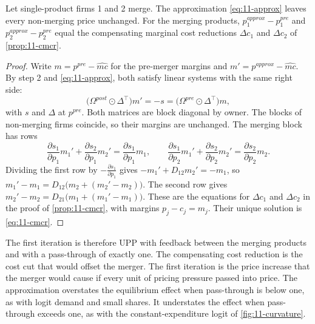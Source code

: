 \begin{proposition}\label{prop:11-approx}
Let single-product firms 1 and 2 merge. The approximation \eqref{eq:11-approx} leaves every non-merging price unchanged.
For the merging products, $p_1^{approx} - p_1^{pre}$ and $p_2^{approx} - p_2^{pre}$ equal the compensating marginal
cost reductions $\Delta c_1$ and $\Delta c_2$ of \cref{prop:11-cmcr}.
\end{proposition}

\begin{proof}
Write $m = p^{pre} - \widehat{mc}$ for the pre-merger margins and $m' = p^{approx} - \widehat{mc}$. By step 2 and
\eqref{eq:11-approx}, both satisfy linear systems with the same right side:
\begin{equation*}
  \big(\Omega^{post} \odot \Delta^\top\big) m' = -s = \big(\Omega^{pre} \odot \Delta^\top\big) m ,
\end{equation*}
with $s$ and $\Delta$ at $p^{pre}$. Both matrices are block diagonal by owner. The blocks of non-merging firms coincide,
so their margins are unchanged. The merging block has rows
\begin{equation*}
  \frac{\partial s_1}{\partial p_1} m_1' + \frac{\partial s_2}{\partial p_1} m_2' = \frac{\partial s_1}{\partial p_1} m_1 , \qquad
  \frac{\partial s_1}{\partial p_2} m_1' + \frac{\partial s_2}{\partial p_2} m_2' = \frac{\partial s_2}{\partial p_2} m_2 .
\end{equation*}
Dividing the first row by $-\frac{\partial s_1}{\partial p_1}$ gives $-m_1' + D_{12} m_2' = -m_1$, so
$m_1' - m_1 = D_{12}\big(m_2 + (m_2' - m_2)\big)$. The second row gives $m_2' - m_2 = D_{21}\big(m_1 + (m_1' - m_1)\big)$.
These are the equations for $\Delta c_1$ and $\Delta c_2$ in the proof of \cref{prop:11-cmcr}, with margins
$p_j - c_j = m_j$. Their unique solution is \eqref{eq:11-cmcr}.
\end{proof}

The first iteration is therefore UPP with feedback between the merging products and with a pass-through of exactly
one. The compensating cost reduction is the cost cut that would offset the merger. The first iteration is the price
increase that the merger would cause if every unit of pricing pressure passed into price. The approximation overstates
the equilibrium effect when pass-through is below one, as with logit demand and small shares. It understates the effect
when pass-through exceeds one, as with the constant-expenditure logit of \cref{fig:11-curvature}.

